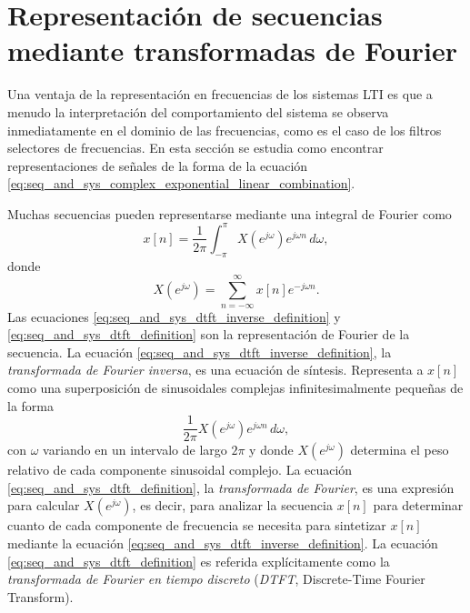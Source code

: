 \documentclass[a4paper]{report}
\begin{document}
\section{Representación de secuencias mediante transformadas de Fourier}\label{sec:fourier_transform_representation}

Una ventaja de la representación en frecuencias de los sistemas LTI es que a menudo la interpretación del comportamiento del sistema se observa inmediatamente en el dominio de las frecuencias, como es el caso de los filtros selectores de frecuencias. En esta sección se estudia como encontrar representaciones de señales de la forma de la ecuación \ref{eq:seq_and_sys_complex_exponential_linear_combination}.

Muchas secuencias pueden representarse mediante una integral de Fourier como
\begin{equation}\label{eq:seq_and_sys_dtft_inverse_definition}
 x[n]=\frac{1}{2\pi}\int_{-\pi}^\pi X(e^{j\omega})e^{j\omega n}\,d\omega,
\end{equation}
donde 
\begin{equation}\label{eq:seq_and_sys_dtft_definition}
 X(e^{j\omega})=\sum_{n=-\infty}^\infty x[n]e^{-j\omega n}.
\end{equation}
Las ecuaciones \ref{eq:seq_and_sys_dtft_inverse_definition} y \ref{eq:seq_and_sys_dtft_definition} son la representación de Fourier de la secuencia. La ecuación \ref{eq:seq_and_sys_dtft_inverse_definition}, la \emph{transformada de Fourier inversa}, es una ecuación de síntesis. Representa a \(x[n]\) como una superposición de sinusoidales complejas infinitesimalmente pequeñas de la forma
\[
 \frac{1}{2\pi}X(e^{j\omega})e^{j\omega n}\,d\omega,
\]
con \(\omega\) variando en un intervalo de largo \(2\pi\) y donde \(X(e^{j\omega})\) determina el peso relativo de cada componente sinusoidal complejo. La ecuación \ref{eq:seq_and_sys_dtft_definition}, la \emph{transformada de Fourier}, es una expresión para calcular \(X(e^{j\omega})\), es decir, para analizar la secuencia \(x[n]\) para determinar cuanto de cada componente de frecuencia se necesita para sintetizar \(x[n]\) mediante la ecuación \ref{eq:seq_and_sys_dtft_inverse_definition}. La ecuación \ref{eq:seq_and_sys_dtft_definition} es referida explícitamente como la \emph{transformada de Fourier en tiempo discreto} (\emph{DTFT}, Discrete-Time Fourier Transform).
\end{document}
